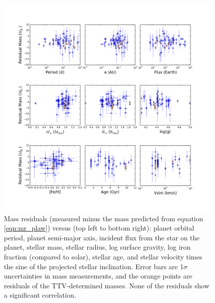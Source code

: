 \documentclass[iop]{emulateapj}
\begin{document}
\begin{figure}[htbp] %
   \centering
    \includegraphics[width=6in]{mr_resids.png} 
   \caption{\small Mass residuals (measured minus the mass predicted from equation \ref{eqn:mr_plaw}) versus (top left to bottom right): planet orbital period, planet semi-major axis, incident flux from the star on the planet, stellar mass, stellar radius, log surface gravity, log iron fraction (compared to solar), stellar age, and stellar velocity times the sine of the projected stellar inclination. Error bars are 1$\sigma$ uncertainties in mass measurements, and the orange points are residuals of the TTV-determined masses.  None of the residuals show a significant correlation.}
   \label{fig:resids}
\end{figure}

\clearpage

{}

\end{document}
